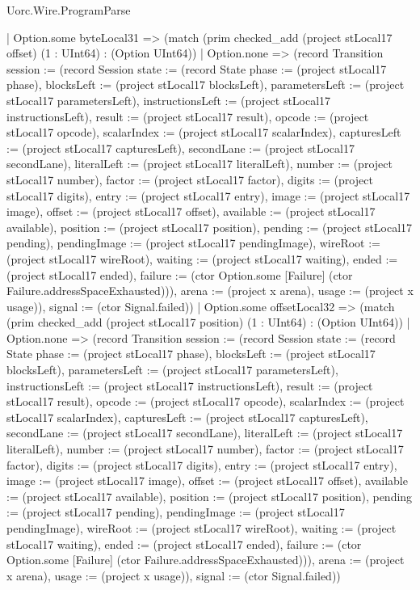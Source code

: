 \begin{lexlean}{Uorc.Wire.ProgramParse}
\begin{semanticmodule}
{            | Option.some byteLocal31 => (match (prim checked_add (project stLocal17 offset) (1 : UInt64) : (Option UInt64))
              | Option.none => (record Transition {session := (record Session {state := (record State {phase := (project stLocal17 phase), blocksLeft := (project stLocal17 blocksLeft), parametersLeft := (project stLocal17 parametersLeft), instructionsLeft := (project stLocal17 instructionsLeft), result := (project stLocal17 result), opcode := (project stLocal17 opcode), scalarIndex := (project stLocal17 scalarIndex), capturesLeft := (project stLocal17 capturesLeft), secondLane := (project stLocal17 secondLane), literalLeft := (project stLocal17 literalLeft), number := (project stLocal17 number), factor := (project stLocal17 factor), digits := (project stLocal17 digits), entry := (project stLocal17 entry), image := (project stLocal17 image), offset := (project stLocal17 offset), available := (project stLocal17 available), position := (project stLocal17 position), pending := (project stLocal17 pending), pendingImage := (project stLocal17 pendingImage), wireRoot := (project stLocal17 wireRoot), waiting := (project stLocal17 waiting), ended := (project stLocal17 ended), failure := (ctor Option.some [Failure] (ctor Failure.addressSpaceExhausted))}), arena := (project x arena), usage := (project x usage)}), signal := (ctor Signal.failed)})
              | Option.some offsetLocal32 => (match (prim checked_add (project stLocal17 position) (1 : UInt64) : (Option UInt64))
                | Option.none => (record Transition {session := (record Session {state := (record State {phase := (project stLocal17 phase), blocksLeft := (project stLocal17 blocksLeft), parametersLeft := (project stLocal17 parametersLeft), instructionsLeft := (project stLocal17 instructionsLeft), result := (project stLocal17 result), opcode := (project stLocal17 opcode), scalarIndex := (project stLocal17 scalarIndex), capturesLeft := (project stLocal17 capturesLeft), secondLane := (project stLocal17 secondLane), literalLeft := (project stLocal17 literalLeft), number := (project stLocal17 number), factor := (project stLocal17 factor), digits := (project stLocal17 digits), entry := (project stLocal17 entry), image := (project stLocal17 image), offset := (project stLocal17 offset), available := (project stLocal17 available), position := (project stLocal17 position), pending := (project stLocal17 pending), pendingImage := (project stLocal17 pendingImage), wireRoot := (project stLocal17 wireRoot), waiting := (project stLocal17 waiting), ended := (project stLocal17 ended), failure := (ctor Option.some [Failure] (ctor Failure.addressSpaceExhausted))}), arena := (project x arena), usage := (project x usage)}), signal := (ctor Signal.failed)})
}
\end{semanticmodule}
\end{lexlean}
